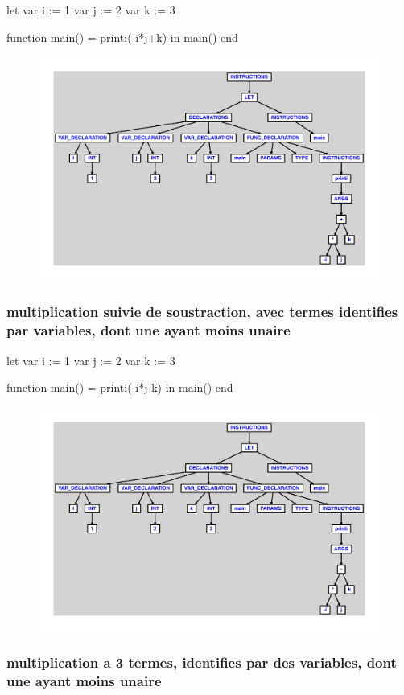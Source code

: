 \documentclass{article}
\begin{document}
\begin{verbatimtab}
let
	var i := 1
	var j := 2
	var k := 3

	function main() = printi(-i*j+k)
in main() end
\end{verbatimtab}
\begin{figure}[H]\centering\includegraphics[max width=\textwidth]{ast/ast_83.pdf}\end{figure}\subsubsection{multiplication suivie de soustraction, avec termes identifies par variables, dont une ayant moins unaire}
\begin{verbatimtab}
let
	var i := 1
	var j := 2
	var k := 3

	function main() = printi(-i*j-k)
in main() end
\end{verbatimtab}
\begin{figure}[H]\centering\includegraphics[max width=\textwidth]{ast/ast_84.pdf}\end{figure}\subsubsection{multiplication a 3 termes, identifies par des variables, dont une ayant moins unaire}
\end{document}
